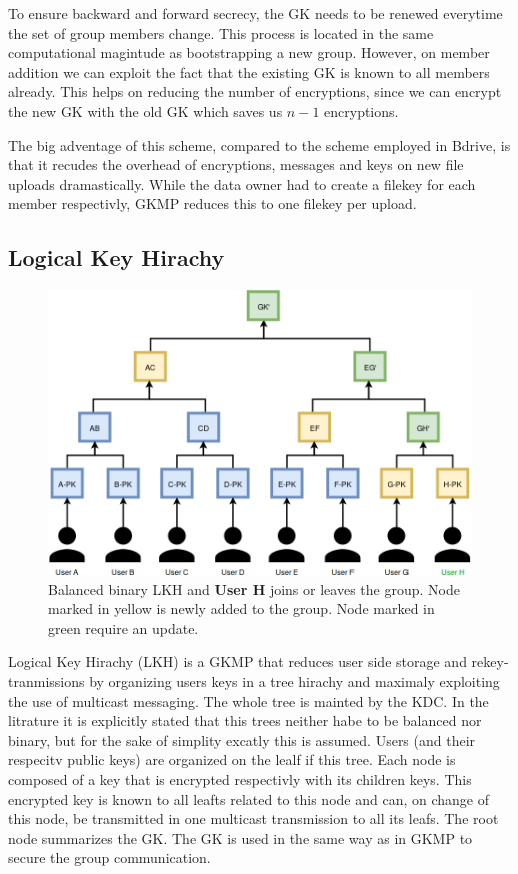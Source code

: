 To ensure backward and forward secrecy, the GK needs to be renewed everytime the set of group members change. This process is located in the same computational magintude as bootstrapping a new group. However, on member addition we can exploit the fact that the existing GK is known to all members already. This helps on reducing the number of encryptions, since we can encrypt the new GK with the old GK which saves us $n-1$ encryptions.  

The big adventage of this scheme, compared to the scheme employed in Bdrive, is that it recudes the overhead of encryptions, messages and keys on new file uploads dramastically. While the data owner had to create a filekey for each member respectivly, GKMP reduces this to one filekey per upload.  

\subsection{Logical Key Hirachy}
\begin{figure}[!ht]
\centering
    \includegraphics[width=0.8\linewidth]{img/LKH.png}
    \caption{Balanced binary LKH and \textbf{User H} joins or leaves the group. Node marked in yellow is newly added to the group. Node marked in green require an update.}
    \label{fig:lkh}
\end{figure}

Logical Key Hirachy (LKH)\cite{wallner1999key} is a GKMP that reduces user side storage and rekey-tranmissions by organizing users keys in a tree hirachy and maximaly exploiting the use of multicast messaging. The whole tree is mainted by the KDC. In the litrature it is explicitly stated that this trees neither habe to be balanced nor binary, but for the sake of simplity excatly this is assumed. Users (and their respecitv public keys) are organized on the lealf if this tree. Each node is composed of a key that is encrypted respectivly with its children keys. This encrypted key is known to all leafts related to this node and can, on change of this node, be transmitted in one multicast transmission to all its leafs. The root node summarizes the GK. The GK is used in the same way as in GKMP to secure the group communication. 

